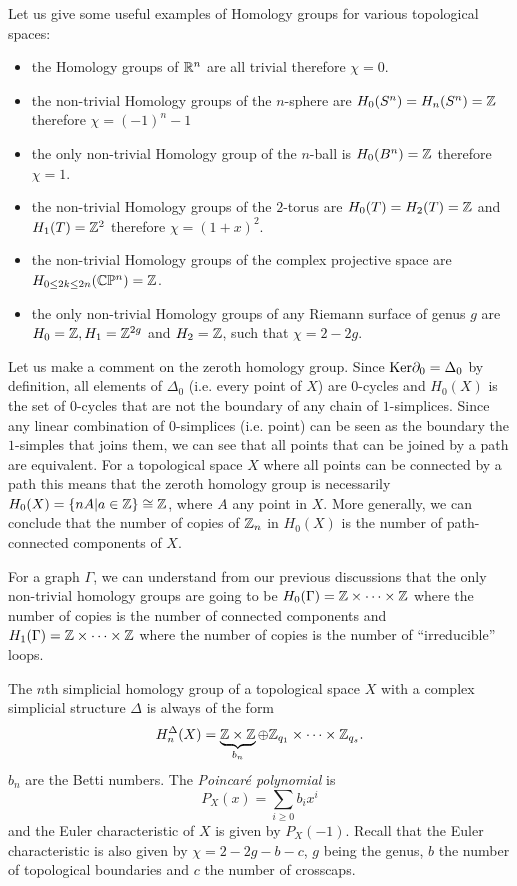     \begin{examp*}
        Let us give some useful examples of Homology groups for various topological spaces:
        \begin{itemize}
            \item the Homology groups of $\mathbb{R}^n$ are all trivial therefore $\chi=0$.
            \item the non-trivial Homology groups of the $n$-sphere are $H_0(S^n)=H_n(S^n)=\mathbb{Z}$ therefore $\chi=(-1)^n-1$
            \item the only non-trivial Homology group of the $n$-ball is $H_0(B^n)=\mathbb{Z}$ therefore $\chi=1$.
            \item the non-trivial Homology groups of the $2$-torus are $H_0(T)=H_2(T)=\mathbb{Z}$ and $H_1(T)=\mathbb{Z}^2$ therefore $\chi=(1+x)^2$.
            \item the non-trivial Homology groups of the complex projective space are $H_{0\leq 2k\leq 2n}(\mathbb{C}\mathbb{P}^n)=\mathbb{Z}$.
            \item the only non-trivial Homology groups of any Riemann surface of genus $g$ are $H_0=\mathbb{Z}, H_1=\mathbb{Z}^{2g}$ and $H_2=\mathbb{Z}$, such that $\chi=2-2g$.
        \end{itemize}
    \end{examp*}
    Let us make a comment on the zeroth homology group. Since $\text{Ker}\partial_0=\Delta_0$ by definition, all elements of $\Delta_0$ (i.e. every point of $X$) are $0$-cycles and $H_0(X)$ is the set of $0$-cycles that are not the boundary of any chain of $1$-simplices. Since any linear combination of $0$-simplices (i.e. point) can be seen as the boundary the $1$-simples that joins them, we can see that all points that can be joined by a path are equivalent. For a topological space $X$ where all points can be connected by a path this means that the zeroth homology group is necessarily $H_{0}(X)=\{nA|a\in\mathbb{Z}\}\cong\mathbb{Z}$, where $A$ any point in $X$. More generally, we can conclude that the number of copies of $\mathbb{Z}_n$ in $H_0(X)$ is the number of path-connected components of $X$.

    For a graph $\Gamma$, we can understand from our previous discussions that the only non-trivial homology groups are going to be $H_0(\Gamma)=\mathbb{Z}\times\dots\times\mathbb{Z}$ where the number of copies is the number of connected components and $H_1(\Gamma)=\mathbb{Z}\times\dots\times\mathbb{Z}$ where the number of copies is the number of ``irreducible'' loops.

    The $n$th simplicial homology group of a topological space $X$ with a complex simplicial structure $\Delta$ is always of the form
    \begin{equation}
        H^\Delta_n(X)=\underbrace{\mathbb{Z}\times\mathbb{Z}}_{b_n}\oplus\mathbb{Z}_{q_1}\times\dots\times\mathbb{Z}_{q_s}.
    \end{equation}
    $b_n$ are the Betti numbers. The \emph{Poincaré polynomial} is
    \begin{equation}
        P_X(x)=\sum_{i\geq 0}b_ix^i
    \end{equation}
    and the Euler characteristic of $X$ is given by $P_X(-1)$. Recall that the Euler characteristic is also given by $\chi=2-2g-b-c$, $g$ being the genus, $b$ the number of topological boundaries and $c$ the number of crosscaps.

